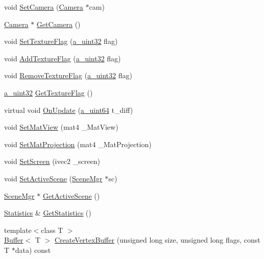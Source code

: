 \begin{DoxyCompactItemize}
void \hyperlink{class_agmd_1_1_driver_a1eb6624a294fc7020491b097893cc413}{Set\+Camera} (\hyperlink{class_agmd_1_1_camera}{Camera} $\ast$cam)
\item 
\hyperlink{class_agmd_1_1_camera}{Camera} $\ast$ \hyperlink{class_agmd_1_1_driver_a6994b46ccadacdbadae526fc9cb6ea1b}{Get\+Camera} ()
\item 
void \hyperlink{class_agmd_1_1_driver_a77c765bf0e8a52d67fb3d5ab00a9513f}{Set\+Texture\+Flag} (\hyperlink{_common_defines_8h_a964296f9770051b9e4807b1f180dd416}{a\+\_\+uint32} flag)
\item 
void \hyperlink{class_agmd_1_1_driver_a819b761e20b3db3e3804983753ccf66d}{Add\+Texture\+Flag} (\hyperlink{_common_defines_8h_a964296f9770051b9e4807b1f180dd416}{a\+\_\+uint32} flag)
\item 
void \hyperlink{class_agmd_1_1_driver_a8d52a15414214f02e7e472f3fb5d6588}{Remove\+Texture\+Flag} (\hyperlink{_common_defines_8h_a964296f9770051b9e4807b1f180dd416}{a\+\_\+uint32} flag)
\item 
\hyperlink{_common_defines_8h_a964296f9770051b9e4807b1f180dd416}{a\+\_\+uint32} \hyperlink{class_agmd_1_1_driver_a3157d0c87887c8ccd55e6be13942afe0}{Get\+Texture\+Flag} ()
\item 
virtual void \hyperlink{class_agmd_1_1_driver_a1575876d9c54b9ed8e841f7a31049427}{On\+Update} (\hyperlink{_common_defines_8h_a6c5192ec3c55d6e5b13d2dbaa082bdea}{a\+\_\+uint64} t\+\_\+diff)
\item 
void \hyperlink{class_agmd_1_1_driver_a382852489bb3aa834d0e65059a2b4d70}{Set\+Mat\+View} (mat4 \+\_\+\+Mat\+View)
\item 
void \hyperlink{class_agmd_1_1_driver_af3d4d9d04dac8478f67b27f1a2894204}{Set\+Mat\+Projection} (mat4 \+\_\+\+Mat\+Projection)
\item 
void \hyperlink{class_agmd_1_1_driver_a34d0dfd09cfe090268806c7dd5a8b0e0}{Set\+Screen} (ivec2 \+\_\+screen)
\item 
void \hyperlink{class_agmd_1_1_driver_ae7bb6fde1c016329ed9b61d61ffc5e06}{Set\+Active\+Scene} (\hyperlink{class_agmd_1_1_scene_mgr}{Scene\+Mgr} $\ast$sc)
\item 
\hyperlink{class_agmd_1_1_scene_mgr}{Scene\+Mgr} $\ast$ \hyperlink{class_agmd_1_1_driver_ae2f53381d96063c7dab24d62637df6ec}{Get\+Active\+Scene} ()
\item 
\hyperlink{class_agmd_1_1_statistics}{Statistics} \& \hyperlink{class_agmd_1_1_driver_a173f21b78beddc1227b2a8aec81f2631}{Get\+Statistics} ()
\item 
{\footnotesize template$<$class T $>$ }\\\hyperlink{class_agmd_1_1_buffer}{Buffer}$<$ T $>$ \hyperlink{class_agmd_1_1_driver_a2f28ead26c46cf0d4d44176f7d61ab70}{Create\+Vertex\+Buffer} (unsigned long size, unsigned long flags, const T $\ast$data) const 

\end{DoxyCompactItemize}
